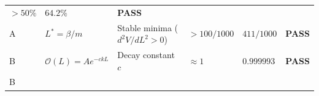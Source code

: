 \documentclass[
  11pt,
]{article}
\begin{document}
\begin{longtable}[]{@{}llllll@{}}
\begin{minipage}[t]{0.14\columnwidth}
\(> 50\%\)\strut
\end{minipage} & \begin{minipage}[t]{0.14\columnwidth}\raggedright
\(64.2\%\)\strut
\end{minipage} & \begin{minipage}[t]{0.14\columnwidth}\raggedright
\textbf{PASS}\strut
\end{minipage}\tabularnewline
\begin{minipage}[t]{0.14\columnwidth}\raggedright
A\strut
\end{minipage} & \begin{minipage}[t]{0.14\columnwidth}\raggedright
\(L^* = \beta/m\)\strut
\end{minipage} & \begin{minipage}[t]{0.14\columnwidth}\raggedright
Stable minima (\(d^2V/dL^2 > 0\))\strut
\end{minipage} & \begin{minipage}[t]{0.14\columnwidth}\raggedright
\(> 100/1000\)\strut
\end{minipage} & \begin{minipage}[t]{0.14\columnwidth}\raggedright
\(411/1000\)\strut
\end{minipage} & \begin{minipage}[t]{0.14\columnwidth}\raggedright
\textbf{PASS}\strut
\end{minipage}\tabularnewline
\begin{minipage}[t]{0.14\columnwidth}\raggedright
B\strut
\end{minipage} & \begin{minipage}[t]{0.14\columnwidth}\raggedright
\(\mathcal{O}(L) = Ae^{-ckL}\)\strut
\end{minipage} & \begin{minipage}[t]{0.14\columnwidth}\raggedright
Decay constant \(c\)\strut
\end{minipage} & \begin{minipage}[t]{0.14\columnwidth}\raggedright
\(\approx 1\)\strut
\end{minipage} & \begin{minipage}[t]{0.14\columnwidth}\raggedright
\(0.999993\)\strut
\end{minipage} & \begin{minipage}[t]{0.14\columnwidth}\raggedright
\textbf{PASS}\strut
\end{minipage}\tabularnewline
\begin{minipage}[t]{0.14\columnwidth}\raggedright
B\strut
\end{minipage} & \begin{minipage}[t]{0.14\columnwidth}\raggedright

\end{minipage}
\end{longtable}
\end{document}
